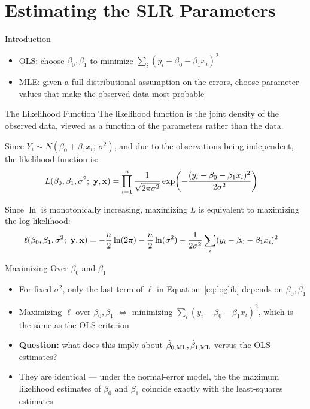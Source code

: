\section{Estimating the SLR Parameters}


\begin{frame}{Introduction}
	\begin{itemize}
		\item OLS: choose $\beta_0,\beta_1$ to minimize $\sum_i(y_i-\beta_0-\beta_1 x_i)^2$
		\item MLE: given a full distributional assumption on the errors, choose parameter values that make the observed data most probable
	\end{itemize}
\end{frame}


\begin{frame}{The Likelihood Function}
	The likelihood function is the joint density of the observed data, viewed as a function of the parameters rather than the data.

	\svspace{0.5em}

	Since $Y_i \sim N(\beta_0+\beta_1 x_i,\ \sigma^2)$, and due to the observations being independent, the likelihood function is:
	\begin{align}
		L(\beta_0,\beta_1,\sigma^2;\ \mathbf{y},\mathbf{x}) &= \prod_{i=1}^n \frac{1}{\sqrt{2\pi\sigma^2}}\exp\!\left(-\frac{(y_i-\beta_0-\beta_1 x_i)^2}{2\sigma^2}\right) \notag
	\end{align}

	\pause
	
	Since $\ln$ is monotonically increasing, maximizing $L$ is equivalent to maximizing the log-likelihood:
	\begin{align}
		\ell(\beta_0,\beta_1,\sigma^2;\ \mathbf{y},\mathbf{x}) &= -\frac n2\ln(2\pi) - \frac n2\ln(\sigma^2) - \frac{1}{2\sigma^2}\sum_i(y_i-\beta_0-\beta_1 x_i)^2 \label{eq:loglik}
	\end{align}
\end{frame}


\begin{frame}{Maximizing Over $\beta_0$ and $\beta_1$}
	\begin{itemize}
		\item For fixed $\sigma^2$, only the last term of $\ell$ in Equation~\eqref{eq:loglik} depends on $\beta_0,\beta_1$
		\item Maximizing $\ell$ over $\beta_0,\beta_1$ $\iff$ minimizing $\sum_i(y_i-\beta_0-\beta_1 x_i)^2$, which is the same as the OLS criterion
	\end{itemize}
	\svspace{1em}
	\begin{itemize}
		\item[] \textbf{Question:} what does this imply about $\hat\beta_{0,\mathrm{ML}},\hat\beta_{1,\mathrm{ML}}$ versus the OLS estimates?
	\end{itemize}
	\svspace{1em}
	\begin{itemize}
		\item They are identical --- under the normal-error model, the the maximum likelihood estimates of \(\beta_0\) and \(\beta_1\) coincide exactly with the least-squares estimates
	\end{itemize}
\end{frame}


